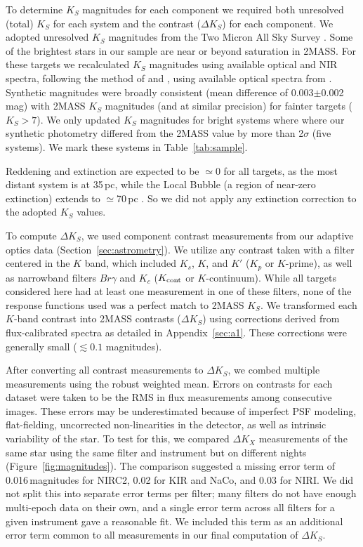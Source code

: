 \documentclass[twocolumn]{aastex62}
\begin{document}
To determine $K_S$ magnitudes for each component we required both unresolved (total) $K_S$ for each system and the contrast ($\Delta K_S$) for each component. We adopted unresolved $K_S$ magnitudes from the Two Micron All Sky Survey \citep[2MASS,][]{Skrutskie2006}. Some of the brightest stars in our sample are near or beyond saturation in 2MASS. For these targets we recalculated $K_S$ magnitudes using available optical and NIR spectra, following the method of \citet{Mann2015a} and \citet{Mann2015b}, using available optical spectra from \citet{Gaidos2014}. Synthetic magnitudes were broadly consistent (mean difference of 0.003$\pm$0.002\,mag) with 2MASS $K_S$ magnitudes (and at similar precision) for fainter targets ($K_S>7$). We only updated $K_S$ magnitudes for bright systems where where our synthetic photometry differed from the 2MASS value by more than 2$\sigma$ (five systems). We mark these systems in Table~\ref{tab:sample}. 

Reddening and extinction are expected to be $\simeq$0 for all targets, as the most distant system is at 35\,pc, while the Local Bubble (a region of near-zero extinction) extends to $\simeq$70\,pc \citep{2009MNRAS.397.1286A}. So we did not apply any extinction correction to the adopted $K_S$ values.

To compute $\Delta K_S$, we used component contrast measurements from our adaptive optics data (Section~\ref{sec:astrometry}). We utilize any contrast taken with a filter centered in the $K$ band, which included $K_s$, $K$, and $K'$ ($K_p$ or $K$-prime), as well as narrowband filters $Br\gamma$ and $K_c$ ($K_{\rm{cont}}$ or $K$-continuum). While all targets considered here had at least one measurement in one of these filters, none of the response functions used was a perfect match to 2MASS $K_S$. We transformed each $K$-band contrast into 2MASS contrasts ($\Delta K_S$) using corrections derived from flux-calibrated spectra as detailed in Appendix~\ref{sec:a1}. These corrections were generally small ($\lesssim0.1$ magnitudes).

After converting all contrast measurements to $\Delta K_S$, we combed multiple measurements using the robust weighted mean. Errors on contrasts for each dataset were taken to be the RMS in flux measurements among consecutive images. These errors may be underestimated because of imperfect PSF modeling, flat-fielding, uncorrected non-linearities in the detector, as well as intrinsic variability of the star. To test for this, we compared $\Delta K_X$ measurements of the same star using the same filter and instrument but on different nights (Figure~\ref{fig:magnitudes}). The comparison suggested a missing error term of 0.016\,magnitudes for NIRC2, 0.02 for KIR and NaCo, and 0.03 for NIRI. We did not split this into separate error terms per filter; many filters do not have enough multi-epoch data on their own, and a single error term across all filters for a given instrument gave a reasonable fit. We included this term as an additional error term common to all measurements in our final computation of $\Delta K_S$.
\end{document}
